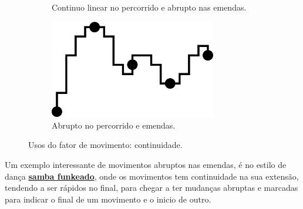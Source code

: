 \begin{figure}[!h]
\begin{subfigure}[b]{0.4\textwidth}
         \caption{Continuo linear no percorrido e abrupto nas emendas.}
         \label{fig:continudade-c}
     \end{subfigure}
     \hfill
     \begin{subfigure}[b]{0.4\textwidth}
         \centering
         \includegraphics[width=0.8\textwidth]{chapters/cap-musicalidade/continudade-d.eps}
         \caption{Abrupto no percorrido e emendas.}
         \label{fig:continudade-d}
     \end{subfigure}
\caption{Usos do fator de movimento: continuidade.}
\label{fig:continudade-all}
\end{figure}

\begin{example}
Um exemplo interessante de movimentos abruptos nas emendas, 
é no estilo de dança \hyperref[subsec:sambafunkeado]{\textbf{samba funkeado}},
onde os movimentos tem continuidade na sua extensão, tendendo a ser rápidos no final,
para chegar a ter mudanças abruptas e marcadas para indicar o final de um movimento e o inicio de outro.
\end{example}

